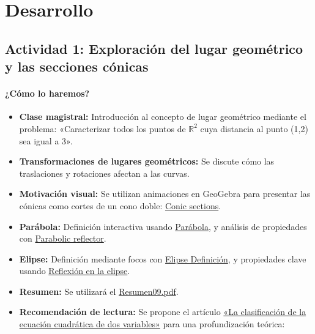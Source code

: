 \documentclass[a4,11pt]{aleph-notas}
\begin{document}
\section*{Desarrollo}

\subsection*{Actividad 1: Exploración del lugar geométrico y las secciones cónicas}

\paragraph{¿Cómo lo haremos?}  
\begin{itemize}[leftmargin=*]
    \item \textbf{Clase magistral:} Introducción al concepto de lugar geométrico mediante el problema: «Caracterizar todos los puntos de \(\mathbb{R}^2\) cuya distancia al punto (1,2) sea igual a 3».
    \item \textbf{Transformaciones de lugares geométricos:} Se discute cómo las traslaciones y rotaciones afectan a las curvas.
    \item \textbf{Motivación visual:} Se utilizan animaciones en GeoGebra para presentar las cónicas como cortes de un cono doble: \href{https://www.geogebra.org/m/pCg8NFVT}{Conic sections}.
    \item \textbf{Parábola:} Definición interactiva usando \href{https://www.geogebra.org/m/hyttzxdf}{Parábola}, y análisis de propiedades con \href{https://www.geogebra.org/m/u7psybt6}{Parabolic reflector}.
    \item \textbf{Elipse:} Definición mediante focos con \href{https://www.geogebra.org/m/sbtukqr8}{Elipse Definición}, y propiedades clave usando \href{https://www.geogebra.org/m/RB25jv2a}{Reflexión en la elipse}.
    \item \textbf{Resumen:} Se utilizará el \href{https://fcena-puce.github.io/AlgLinealyGeomAnalitica-05-N0068/2-Resumenes/Resumen09.pdf}{Resumen09.pdf}.
    \item \textbf{Recomendación de lectura:} Se propone el artículo \href{https://www.revistas.espol.edu.ec/index.php/matematica/article/view/538}{«La clasificación de la ecuación cuadrática de dos variables»} para una profundización teórica:\\
\end{itemize}
\end{document}
